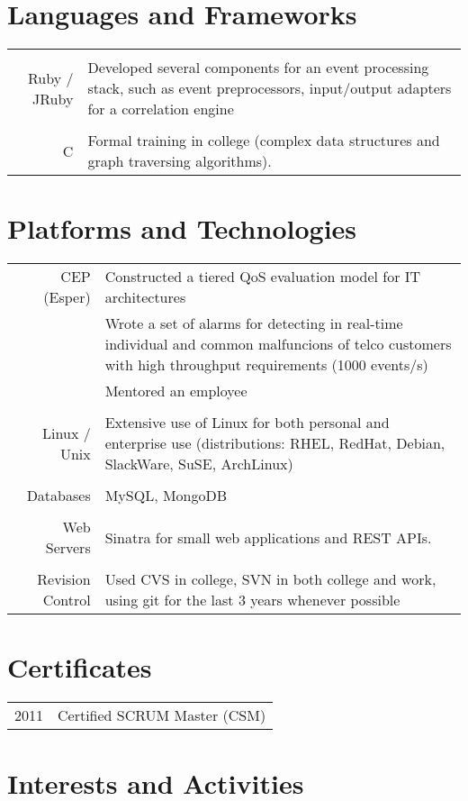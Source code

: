 \documentclass[a4paper,10pt]{article}
\begin{document}
\section{Languages and Frameworks}
\begin{tabular}{r|p{11cm}}
\multicolumn{2}{c}{} \\
Ruby / JRuby & Developed several components for an event processing stack, such
as event preprocessors, input/output adapters for a correlation engine \\
\multicolumn{2}{c}{} \\
C &  Formal training in college (complex data structures and graph traversing algorithms).\\
\end{tabular}

\section{Platforms and Technologies}
\begin{tabular}{r|p{11cm}}
CEP (Esper) & Constructed a tiered QoS evaluation model for IT architectures \\
 & Wrote a set of alarms for detecting in real-time individual and common malfuncions of
 telco customers with high throughput requirements (1000 events/s)\\
 & Mentored an employee \\
\multicolumn{2}{c}{} \\
Linux / Unix &  Extensive use of Linux for both personal and enterprise use (distributions: RHEL, RedHat, Debian, SlackWare, SuSE, ArchLinux) \\
\multicolumn{2}{c}{} \\
Databases & MySQL, MongoDB\\
\multicolumn{2}{c}{} \\
Web Servers & Sinatra for small web applications and REST APIs.\\
\multicolumn{2}{c}{} \\
Revision Control & Used CVS in college, SVN in both college and work, using git for the last 3 years whenever possible\\
\end{tabular}

\section{Certificates}
\begin{tabular}{rl}
 2011 & Certified SCRUM Master (\textsc{CSM}) \\
\end{tabular}

\section{Interests and Activities}
\end{document}
